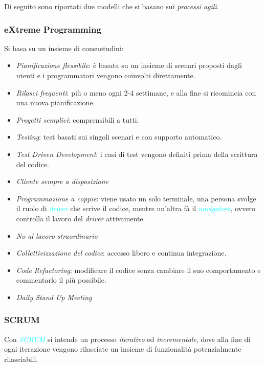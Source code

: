 Di seguito sono riportati due modelli che si basano sui \emph{processi agili}.

\subsubsection{eXtreme Programming}

Si basa su un insieme di consuetudini:

\begin{itemize}
    \item \emph{Pianificazione flessibile}: è basata su un insieme di scenari proposti dagli utenti e i programmatori vengono coinvolti direttamente.
    \item \emph{Rilasci frequenti}: più o meno ogni 2-4 settimane, e alla fine si ricomincia con una nuova pianificazione.
    \item \emph{Progetti semplici}: comprensibili a tutti.
    \item \emph{Testing}: test basati sui singoli scenari e con supporto automatico.
    \item \emph{Test Driven Development}: i casi di test vengono definiti prima della scrittura del codice.
    \item \emph{Cliente sempre a disposizione}
    \item \emph{Programmazione a coppie}: viene usato un solo terminale, una persona svolge il ruolo di \emph{\textcolor{cyan}{driver}}
        che scrive il codice, mentre un'altra fà il \emph{\textcolor{cyan}{navigatore}}, ovvero controlla il lavoro del \emph{driver} attivamente.
    \item \emph{No al lavoro straordinario}
    \item \emph{Collettivizzazione del codice}: accesso libero e continua integrazione.
    \item \emph{Code Refactoring}: modificare il codice senza cambiare il suo comportamento e commentarlo il più possibile.
    \item \emph{Daily Stand Up Meeting}
\end{itemize}

\subsubsection{SCRUM}

\begin{definition}[SCRUM]
    Con \emph{\textcolor{cyan}{SCRUM}} si intende un processo \emph{iterativo} ed \emph{incrementale}, dove alla fine
    di ogni iterazione vengono rilasciate un insieme di funzionalità potenzialmente rilasciabili.
\end{definition}

